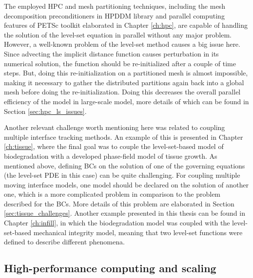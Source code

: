 The employed HPC and mesh partitioning techniques, including the mesh decomposition preconditioners in HPDDM library and parallel computing features of PETSc toolkit elaborated in Chapter \ref{ch:hpc}, are capable of handling the solution of the level-set equation in parallel without any major problem. However, a well-known problem of the level-set method causes a big issue here. Since advecting the implicit distance function causes perturbation in its numerical solution, the function should be re-initialized after a couple of time steps. But, doing this re-initialization on a partitioned mesh is almost impossible, making it necessary to gather the distributed partitions again back into a global mesh before doing the re-initialization. Doing this decreases the overall parallel efficiency of the model in large-scale model, more details of which can be found  in Section \ref{sec:hpc_ls_issues}.

Another relevant challenge worth mentioning here was related to coupling multiple interface tracking methods. An example of this is presented in Chapter \ref{ch:tissue}, where the final goal was to couple the level-set-based model of biodegradation with a developed phase-field model of tissue growth. As mentioned above, defining BCs on the solution of one of the governing equations (the level-set PDE in this case) can be quite challenging. For coupling multiple moving interface models, one model should be declared on the solution of another one, which is a more complicated problem in comparison to the problem described for the BCs. More details of this problem are elaborated in Section \ref{sec:tissue_challenges}. Another example presented in this thesis can be found in Chapter \ref{ch:infill}, in which the biodegradation model was coupled with the level-set-based mechanical integrity model, meaning that two level-set functions were defined to describe different phenomena.

\subsection{High-performance computing and scaling} \label{sec:conclusion_hpc}

